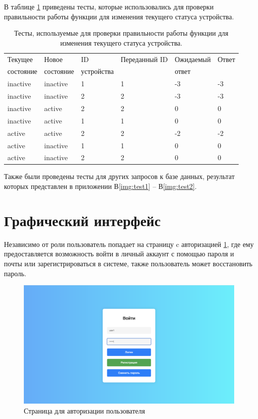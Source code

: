 В таблице \ref{tab:tests} приведены тесты, 
которые использовались для проверки правильности 
работы функции для изменения текущего статуса устройства.

\begin{table}[H]
    \centering
    \caption{\label{tab:tests} Тесты, используемые для проверки правильности 
    работы функции для изменения текущего статуса устройства.}
    \begin{tabular}{|l|l|l|l|l|l|}
    \hline
        Текущее & Новое  & ID & Переданный ID & Ожидаемый & Ответ \\
        состояние & состояние & устройства &  & ответ &  \\ \hline
        inactive & inactive & 1 & 1 & -3 & -3 \\ \hline
        inactive & inactive & 2 & 2 & -3 & -3 \\ \hline
        inactive & active & 2 & 2 & 0 & 0 \\ \hline
        inactive & active & 1 & 1 & 0 & 0 \\ \hline
        active & active & 2 & 2 & -2 & -2 \\ \hline
        active & inactive & 1 & 1 & 0 & 0 \\ \hline
        active & inactive & 2 & 2 & 0 & 0 \\ \hline
    \end{tabular}
\end{table}

Также были проведены тесты для других запросов к базе данных, результат которых представлен 
в приложении В\ref{img:test1} -- В\ref{img:test2}.

\section{Графический интерфейс}

Независимо от роли пользователь попадает на страницу c авторизацией \ref{img:auth}, где ему предоставляется возможность 
войти в личный аккаунт с помощью пароля и почты или зарегистрироваться в системе, также пользователь может восстановить пароль.

\begin{figure}[H]
    \includegraphics[width=1\linewidth]{img/auth.png}
    \caption{\label{img:auth} Страница для авторизации пользователя}
\end{figure}
\noindent

